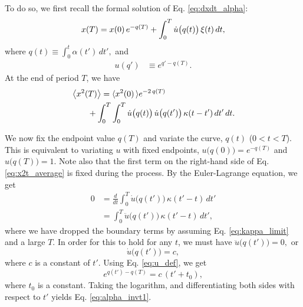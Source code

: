 \documentclass[reprint, floatfix]{revtex4-1}
\begin{document}
To do so, we first recall
the formal solution of Eq. \eqref{eq:dxdt_alpha}:
%
\begin{equation}
x(T)
=
x(0) \, e^{-q(T)}
+
\int_0^T
  \dot u\bigl( q(t) \bigr) \, \xi(t) \, dt,
\notag
\end{equation}
%
where
%
$
q(t) \equiv \int_0^t \alpha(t') \, dt',
$
%
and
%
\begin{align}
u(q')
&\equiv
e^{q' - q(T)}.
\label{eq:u_def}
\end{align}
At the end of period $T$, we have
\begin{align}
&\left\langle x^2(T) \right\rangle
=
\langle x^2(0) \,
\rangle e^{-2 \, q(T)}
\notag
\\
&\qquad
+
\int_0^T \int_0^T
  \dot u\bigl( q(t) \bigr) \,
  \dot u\bigl( q(t') \bigr) \,
  \kappa(t - t') \, dt' \, dt.
\label{eq:x2t_average}
\end{align}


We now fix the endpoint value $q(T)$
and variate the curve, $q(t)$ ($0 < t < T$).
%
This is equivalent to variating $u$
with fixed endpoints,
$u\bigl( q(0) \bigr)  = e^{- q(T)}$
and
$u\bigl( q(T) \bigr) = 1$.
%
Note also that the first term on the right-hand side
of Eq. \eqref{eq:x2t_average} is fixed during
the process.
%
%
By the Euler-Lagrange equation, we get
$$
\begin{aligned}
0
&=
\frac{d}{dt} \int_0^T
  \dot u\bigl( q(t') \bigr) \, \kappa(t' - t) \, dt'
\\
&= \int_0^T
  \ddot u\bigl( q(t') \bigr) \, \kappa(t' - t) \, dt',
\end{aligned}
$$
where we have dropped the boundary terms
by assuming Eq. \eqref{eq:kappa_limit}
and a large $T$.
%
%
In order for this to hold for any $t$,
we must have
%
$
\ddot u\bigl( q(t') \bigr) = 0
,
$
or
\begin{equation}
  \dot u\bigl( q(t') \bigr) = c
  ,
\label{eq:dudt_const}
\end{equation}
%
where $c$ is a constant of $t'$.
%
Using Eq. \eqref{eq:u_def},
we get
$$
e^{ q(t') - q(T) }
=
c \, (t' + t_0),
$$
where $t_0$ is a constant.
%
Taking the logarithm,
and differentiating both sides
with respect to $t'$
yields Eq. \eqref{eq:alpha_invt1}.
\end{document}
